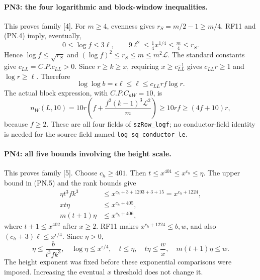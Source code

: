 \documentclass[11pt,a4paper]{article}
\numberwithin{equation}{section}
\theoremstyle{remark}\newtheorem{remark}[theorem]{Remark}
\begin{document}
\paragraph{PN3: the four logarithmic and block-window inequalities.}
This proves family [4]. For $m\geq4$, evenness gives
$r_S=m/2-1\geq m/4$. RF11 and (PN.4) imply, eventually,
\[
 0\leq\log f\leq3\ell,\qquad
 9\ell^2\leq\tfrac14x^{1/4}\leq\tfrac m4\leq r_S.
                                                               \tag{PN.10}
\]
Hence $\log f\leq\sqrt{r_S}$ and
$(\log f)^2\leq r_S\leq m\leq m^2\mathcal L$.
The standard constants give $c_{LL}=C.P.c_{LL}>0$.
Since $r\geq k\geq x$, requiring $x\geq c_{LL}^{-1}$ gives
$c_{LL}r\geq1$ and $\log r\geq\ell$. Therefore
\[
 \log\log b=\epsilon\ell\leq\ell
                    \leq c_{LL}rf\log r.                    \tag{PN.11}
\]
The actual block expression, with $C.P.C_{nW}=10$, is
\[
 n_W(L,10)=10r\left(f+\frac{f^2(k-1)^3\mathcal L^2}{m}\right)
             \geq10rf\geq(4f+10)r,                         \tag{PN.12}
\]
because $f\geq2$. These are all four fields of
\texttt{szRow\_\allowbreak logf}; no conductor-field identity is needed for the
source field named \texttt{log\_\allowbreak sq\_\allowbreak conductor\_\allowbreak le}.

\paragraph{PN4: all five bounds involving the height scale.}
This proves family [5]. Choose $c_h\geq401$. Then
$t\leq x^{401}\leq x^{c_h}\leq\eta$.
The upper bound in (PN.5) and the rank bounds give
\begin{align*}
 \eta t^3fk^3&\leq x^{c_h+3+1203+3+15}=x^{c_h+1224},\\
 xt\eta&\leq x^{c_h+405},\\
 m(t+1)\eta&\leq x^{c_h+406},
\end{align*}
where $t+1\leq x^{402}$ after $x\geq2$.
RF11 makes $x^{c_h+1224}\leq b,w$, and also
$(c_h+3)\ell\leq x^{\epsilon/4}$. Since $\eta>0$,
\[
 \boxed{\quad
 \eta\leq\frac{b}{t^3fk^3},\quad
 \log\eta\leq x^{\epsilon/4},\quad
 t\leq\eta,\quad t\eta\leq\frac wx,\quad
 m(t+1)\eta\leq w.\quad}                                  \tag{PN.13}
\]
The height exponent was fixed before these exponential comparisons
were imposed. Increasing the eventual $x$ threshold does not change it.
\end{document}
